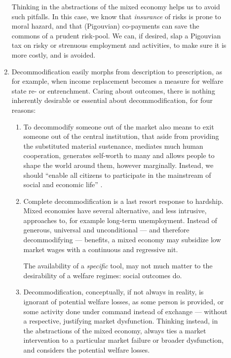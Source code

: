 \begin{description}
\begin{enumerate}
		Thinking in the abstractions of the mixed economy helps us to avoid such pitfalls.
		In this case, we know that \emph{insurance} of risks is prone to moral hazard, and that (Pigouvian) co-payments can save the commons of a prudent risk-pool.
		We can, if desired, slap a Pigouvian tax on risky or strenuous employment and activities, to make sure it is more costly, and is avoided.

		\item Decommodification easily morphs from description to prescription, as for example, when income replacement becomes a measure for welfare state re- or entrenchment.
		Caring about outcomes, there is nothing inherently desirable or essential about decommodification, for four reasons:

			\begin{enumerate}
				\item To decommodify someone out of the market also means to exit someone out of the central institution, that aside from providing the substituted material sustenance, mediates much human cooperation, generates self-worth to many and allows people to shape the world around them, however marginally.
				Instead, we should ``enable all citizens to participate in the mainstream of social and economic life'' \citep[ix]{Esping-Andersen2002}.

				\item Complete decommodification is a last resort response to hardship.
				Mixed economies have several alternative, and less intrusive, approaches to, for example long-term unemployment.
				Instead of generous, universal and unconditional --- and therefore decommodifying --- benefits, a mixed economy may subsidize low market wages with a continuous and regressive \gls{nit}.

				The availability of a \emph{specific} tool, may not much matter to the desirability of a welfare regimes:
				social outcomes do.

				\item Decommodification, conceptually, if not always in reality, is ignorant of potential welfare losses, as some person is provided, or some activity done under command instead of exchange --- without a respective, justifying market dysfunction.
				Thinking instead, in the abstractions of the mixed economy, always ties a market intervention to a particular market failure or broader dysfunction, and considers the potential welfare losses.
			\end{enumerate}


\end{enumerate}
\end{description}
